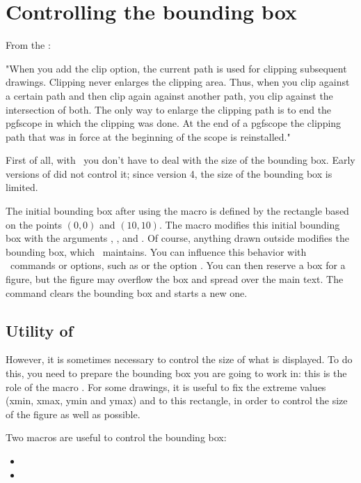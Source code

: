 \section{Controlling the bounding box}
From the : 

"When you add the clip option, the current path is used for clipping subsequent drawings. Clipping never enlarges the clipping area. Thus, when you clip against a certain path and then clip again against another path, you clip against the intersection of both.
The only way to enlarge the clipping path is to end the {pgfscope} in which the clipping was done. At the end of a {pgfscope} the clipping path that was in force at the beginning of the scope is reinstalled."


First of all, with \TIKZ\ you don't have to deal with the size of the bounding box. Early versions of  did not control it; since version 4, the size of the bounding box is limited.

The initial bounding box after using the macro  is defined by the rectangle based on the points $(0,0)$ and $(10,10)$. The macro  modifies this initial bounding box with the arguments , ,  and . Of course, anything drawn outside modifies the bounding box, which \TIKZ\ maintains. You can influence this behavior with \TIKZ\ commands or options, such as  or the option . You can then reserve a box for a figure, but the figure may overflow the box and spread over the main text.
The command  clears the bounding box and starts a new one.

\subsection{Utility of } 
 However, it is sometimes necessary to control the size of what is displayed.
 To do this, you need to prepare the bounding box you are going to work in: this is the role of the macro . For some drawings, it is useful to fix the extreme values (xmin, xmax, ymin and ymax) and to  this rectangle, in order to control the size of the figure as well as possible.

Two macros are useful to control the bounding box:
\begin{itemize}
   \item {}
   \item {}
\end{itemize}
\vspace{20pt}


